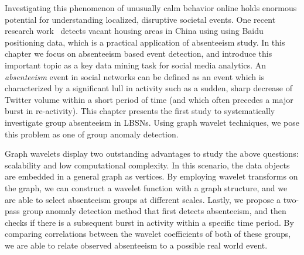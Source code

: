 Investigating this phenomenon of unusually calm behavior online holds enormous potential for understanding localized, disruptive societal events. One recent research work~\cite{chi2015ghost} detects vacant housing areas in China using using Baidu positioning data, which is a practical application of absenteeism study. In this chapter we focus on absenteeism based event detection, and introduce this important topic as a key data mining task for social media analytics.
An \textit{absenteeism} event in social networks can be defined as an event which is characterized by a significant lull in activity such as a sudden, sharp decrease of Twitter volume within a short period of time (and which  often precedes a major burst in re-activity).
This chapter presents the first study to systematically investigate group absenteeism in LBSNs.
Using graph wavelet techniques, we pose this problem as one of group anomaly detection.
%
%

Graph wavelets display two outstanding advantages to study the above
questions: scalability and low computational complexity.
In this scenario, the data objects are embedded in a general graph as vertices.
By employing wavelet transforms on the graph, we can construct a wavelet function with a graph structure, and we are able to select absenteeism groups at different scales.
Lastly, we propose a two-pass group anomaly detection method that first detects absenteeism, and then checks if there is a subsequent burst in activity within a specific time period.
By comparing correlations between the wavelet coefficients of both of these groups, we are able to relate observed absenteeism to a possible real world event.


